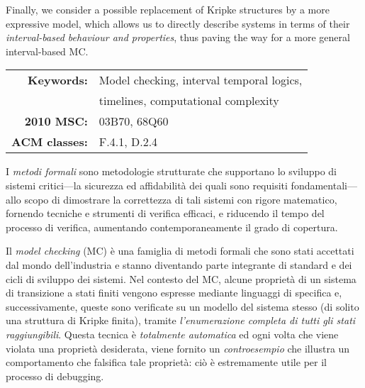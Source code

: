 Finally, we consider a possible replacement of Kripke structures by a more expressive model, which allows us to directly  describe systems in terms of their \emph{interval-based behaviour and properties}, thus paving the way for a more general interval-based MC.

\bigskip
\noindent\hrulefill
\bigskip

\begin{center}
\begin{tabular}{rl}
    \textbf{Keywords:} & Model checking, interval temporal logics, \\
    & timelines, computational complexity \\ 
    \rule[-1ex]{0pt}{4.5ex} \textbf{2010 MSC:} & 03B70, 68Q60 \\ 
    \rule[-1ex]{0pt}{4.5ex} \textbf{ACM classes:} & F.4.1, D.2.4 \\ 
\end{tabular}
\end{center}

\cleardoublepage
\thispagestyle{empty}
\begin{center}
\bfseries \abstractname 
\end{center}

I \emph{metodi formali} sono metodologie strutturate che supportano lo sviluppo di sistemi critici---la sicurezza ed affidabilità dei quali sono requisiti fondamentali---allo scopo di dimostrare la correttezza di tali sistemi con rigore matematico, fornendo tecniche e strumenti di verifica efficaci, e riducendo il tempo del processo di verifica, aumentando contemporaneamente il grado di copertura.

Il \emph{model checking} (MC)
è una famiglia di metodi formali che sono stati accettati dal mondo dell'industria e stanno diventando parte integrante di standard e dei cicli di sviluppo dei sistemi.
Nel contesto del MC, alcune proprietà di un sistema di transizione a stati finiti vengono espresse mediante linguaggi di specifica e, successivamente, queste sono verificate su un modello del sistema stesso (di solito una struttura di Kripke finita), tramite \emph{l'enumerazione completa di tutti gli stati raggiungibili}.
Questa tecnica è \emph{totalmente automatica} ed ogni volta che viene violata una proprietà desiderata, viene fornito un \emph{controesempio} che illustra un comportamento che falsifica tale proprietà: ciò è estremamente utile per il processo di debugging.

